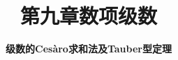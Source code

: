 \usepackage{arydshln}



\title[数学分析]{\texorpdfstring{\LARGE \bfseries 第九章\quad 数项级数}{第九章 数项级数}} %
\author[Cesàro\\可和级数] %
{\Large \bfseries 级数的Cesàro求和法及Tauber型定理}
\date{}






\begin{frame}

\titlepage %

\end{frame}





